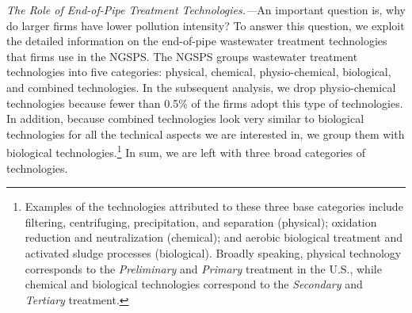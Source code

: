 \documentclass[AEJ]{AEA}
\begin{document}
\textit{The Role of End-of-Pipe Treatment Technologies.---}An important question is, why do larger firms have lower pollution intensity? To answer this question, we exploit the detailed information on the end-of-pipe wastewater treatment technologies that firms use in the NGSPS. The NGSPS groups wastewater treatment technologies into five categories: physical, chemical, physio-chemical, biological, and {combined} technologies. In the subsequent analysis, we drop {physio-chemical} technologies because fewer than 0.5\% of the firms adopt this type of technologies. In addition, because {combined} technologies look very similar to biological technologies for all the technical aspects we are interested in, we group them with {biological} technologies.\footnote{Examples of the technologies attributed to these three base categories include filtering, centrifuging, precipitation, and separation (physical); oxidation reduction and neutralization (chemical); and aerobic biological treatment and activated sludge processes (biological). Broadly speaking, physical technology corresponds to the \textit{Preliminary} and \textit{Primary} treatment in the U.S., while chemical and biological technologies correspond to the \textit{Secondary} and \textit{Tertiary} treatment.} In sum, we are left with three broad categories of technologies.
\end{document}
